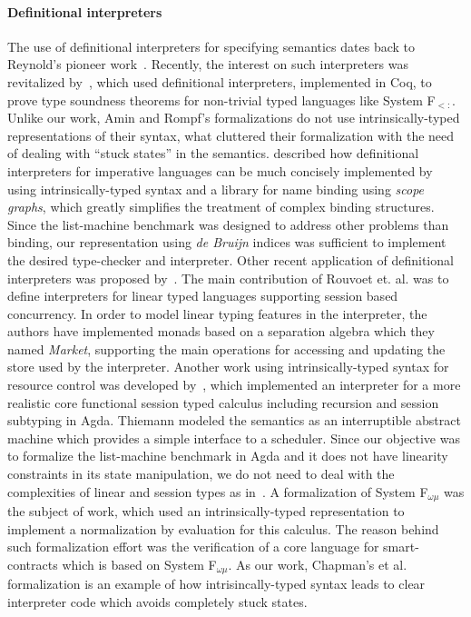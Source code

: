 \documentclass[review]{elsarticle}
\theoremstyle{definition}
\begin{document}
\paragraph{Definitional interpreters}{
The use of definitional interpreters for specifying semantics dates back to Reynold's pioneer work~\cite{Reynolds72}.
Recently, the interest on such interpreters was revitalized by~\citet{Amin17}, which used definitional
interpreters, implemented in Coq, to prove type soundness theorems for non-trivial typed languages like System F$_{<:}$.
Unlike our work, Amin and Rompf's formalizations do not use intrinsically-typed representations of their syntax, what cluttered
their formalization with the need of dealing with ``stuck states'' in the semantics. \citet{Poulsen18} described how
definitional interpreters for imperative languages can be much concisely implemented by using intrinsically-typed syntax and a
library for name binding using \emph{scope graphs}, which greatly simplifies the treatment of complex
binding structures. Since the list-machine benchmark was designed to address other problems than binding, our representation
using \emph{de Bruijn} indices was sufficient to implement the desired type-checker and interpreter.
Other recent application of definitional interpreters was proposed by~\citet{Rouvoet20}. The main contribution
of Rouvoet et. al. was to define interpreters for linear typed languages supporting session based concurrency. In order to model
linear typing features in the interpreter, the authors have implemented monads based on a separation algebra which they
named \emph{Market}, supporting the main operations for accessing and updating the store used by the interpreter.
Another work using intrinsically-typed syntax for resource control was developed by~\citet{Thiemann19}, which
implemented an interpreter for a more realistic core functional session typed calculus including recursion and
session subtyping in Agda. Thiemann modeled the semantics as an interruptible abstract machine which provides a
simple interface to a scheduler. Since our objective was to formalize the list-machine benchmark in Agda and it
does not have linearity constraints in its state manipulation, we do not need to deal with the complexities
of linear and session types as in~\cite{Rouvoet20,Thiemann19}. A formalization of System F$_{\omega\mu}$ was
the subject of \citet{ChapmanKNW19} work, which used an intrinsically-typed representation to
implement a normalization by evaluation for this calculus. The reason behind such formalization effort was
the verification of a core language for smart-contracts which is based on System F$_{\omega\mu}$. As our work,
Chapman's et al. formalization is an example of how intrisincally-typed syntax leads to clear interpreter code
which avoids completely stuck states.}
\end{document}
